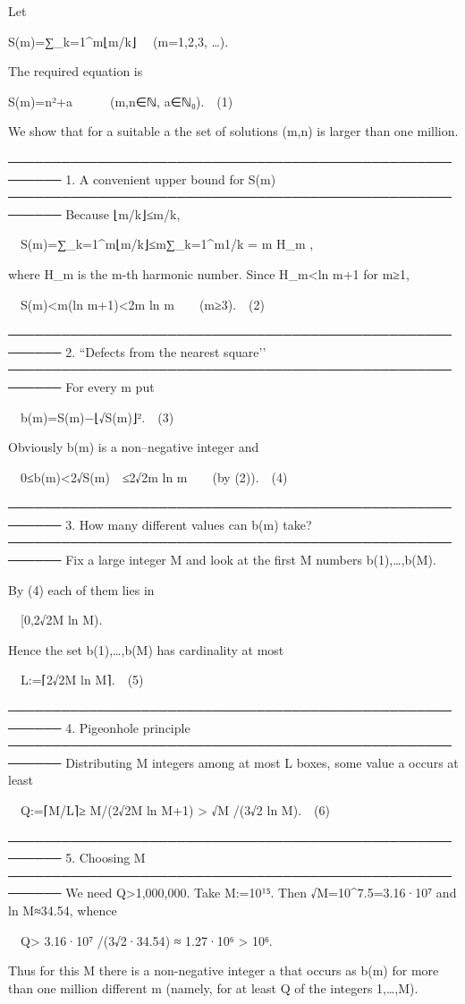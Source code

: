 Let  

S(m)=∑_{k=1}^{m}⌊m/k⌋  (m=1,2,3, …).

The required equation is  

S(m)=n²+a   (m,n∈ℕ, a∈ℕ₀). (1)

We show that for a suitable a the set of solutions (m,n) is larger than one
million.

────────────────────────────────────────────────────────
1.  A convenient upper bound for S(m)
────────────────────────────────────────────────────────
Because ⌊m/k⌋≤m/k,

 S(m)=∑_{k=1}^{m}⌊m/k⌋≤m∑_{k=1}^{m}1/k = m H_m ,  

where H_m is the m-th harmonic number.  Since H_m<ln m+1 for m≥1,  

 S(m)<m(ln m+1)<2m ln m  (m≥3). (2)

────────────────────────────────────────────────────────
2.  “Defects from the nearest square’’
────────────────────────────────────────────────────────
For every m put  

 b(m)=S(m)−⌊√{S(m)}⌋². (3)

Obviously b(m) is a non–negative integer and

 0≤b(m)<2√{S(m)} ≤2√{2m ln m}  (by (2)). (4)

────────────────────────────────────────────────────────
3.  How many different values can b(m) take?
────────────────────────────────────────────────────────
Fix a large integer M and look at the first M numbers b(1),…,b(M).

By (4) each of them lies in  

 [0,2√{2M ln M}).  

Hence the set {b(1),…,b(M)} has cardinality at most  

 L:=⌈2√{2M ln M}⌉. (5)

────────────────────────────────────────────────────────
4.  Pigeonhole principle
────────────────────────────────────────────────────────
Distributing M integers among at most L boxes, some value a occurs at least  

 Q:=⌈M/L⌉≥ M/(2√{2M ln M}+1) > √M /(3√{2 ln M}). (6)

────────────────────────────────────────────────────────
5.  Choosing M
────────────────────────────────────────────────────────
We need Q>1,000,000.  
Take M:=10¹⁵.  Then √M=10^{7.5}=3.16·10⁷ and ln M≈34.54, whence

 Q> 3.16·10⁷ /(3√{2·34.54}) ≈ 1.27·10⁶ > 10⁶.

Thus for this M there is a non-negative integer a that occurs as b(m) for
more than one million different m (namely, for at least Q of the integers
1,…,M).

